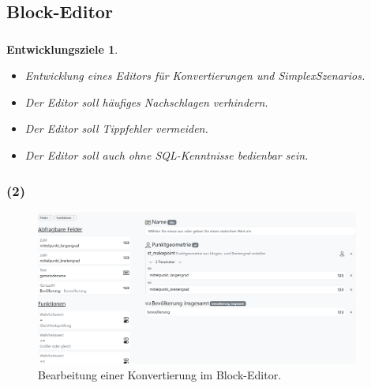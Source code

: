 \subsection{Block-Editor}
\begin{frame}
  \frametitle{\currentsectionname}

  \newtheorem{dev}{Entwicklungsziele}
  \begin{dev}
    \begin{itemize}
      \item Entwicklung eines Editors für Konvertierungen und SimplexSzenarios.
      \item Der Editor soll häufiges Nachschlagen verhindern.
      \item Der Editor soll Tippfehler vermeiden.
      \item Der Editor soll auch ohne SQL-Kenntnisse bedienbar sein.
    \end{itemize}
  \end{dev}


\end{frame}

\begin{frame}
  \frametitle{\currentsectionname{} (2)}

  \begin{figure}
    \begin{center}
      \includegraphics[width=0.95\textwidth]{assets/buffet-simple.png}
    \end{center}
    \caption{Bearbeitung einer Konvertierung im Block-Editor.}
  \end{figure}

\end{frame}
